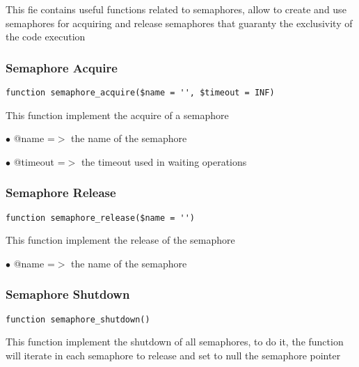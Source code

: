 \documentclass[a4paper]{article}
\begin{document}
This fie contains useful functions related to semaphores, allow to create and use semaphores
for acquiring and release semaphores that guaranty the exclusivity of the code execution

\hypertarget{toc204}{}
\subsubsection{Semaphore Acquire}

\begin{lstlisting}
function semaphore_acquire($name = '', $timeout = INF)
\end{lstlisting}

This function implement the acquire of a semaphore

\begin{compactitem}
\item[\color{myblue}$\bullet$] @name    =$>$ the name of the semaphore
\item[\color{myblue}$\bullet$] @timeout =$>$ the timeout used in waiting operations
\end{compactitem}

\hypertarget{toc205}{}
\subsubsection{Semaphore Release}

\begin{lstlisting}
function semaphore_release($name = '')
\end{lstlisting}

This function implement the release of the semaphore

\begin{compactitem}
\item[\color{myblue}$\bullet$] @name =$>$ the name of the semaphore
\end{compactitem}

\hypertarget{toc206}{}
\subsubsection{Semaphore Shutdown}

\begin{lstlisting}
function semaphore_shutdown()
\end{lstlisting}

This function implement the shutdown of all semaphores, to do it,
the function will iterate in each semaphore to release and set to
null the semaphore pointer
\end{document}

